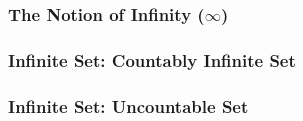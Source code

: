 \documentclass[compress]{beamer}
\begin{document}
 \begin{frame}\frametitle{The Notion of Infinity ($\infty$)}
 \end{frame}



 \begin{frame}\frametitle{Infinite Set: Countably Infinite Set}

\vspace{3in}
 

 \end{frame}
 
 
 
 
 \begin{frame}\frametitle{Infinite Set: Uncountable Set}
\vspace{3in}

 \end{frame}
 
 
 
 
 

 
 
\end{document}
